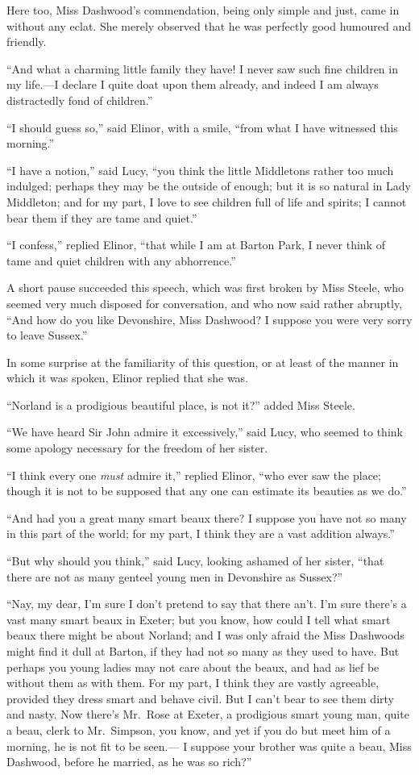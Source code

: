 Here too, Miss Dashwood's commendation, being only
simple and just, came in without any eclat.  She merely
observed that he was perfectly good humoured and friendly.

``And what a charming little family they have!  I
never saw such fine children in my life.---I declare I
quite doat upon them already, and indeed I am always
distractedly fond of children.''

``I should guess so,'' said Elinor, with a smile,
``from what I have witnessed this morning.''

``I have a notion,'' said Lucy, ``you think the little
Middletons rather too much indulged; perhaps they may be the
outside of enough; but it is so natural in Lady Middleton;
and for my part, I love to see children full of life
and spirits; I cannot bear them if they are tame and quiet.''

``I confess,'' replied Elinor, ``that while I am at
Barton Park, I never think of tame and quiet children
with any abhorrence.''

A short pause succeeded this speech, which was first
broken by Miss Steele, who seemed very much disposed
for conversation, and who now said rather abruptly,
``And how do you like Devonshire, Miss Dashwood?  I suppose
you were very sorry to leave Sussex.''

In some surprise at the familiarity of this question,
or at least of the manner in which it was spoken,
Elinor replied that she was.

``Norland is a prodigious beautiful place, is not it?''
added Miss Steele.

``We have heard Sir John admire it excessively,''
said Lucy, who seemed to think some apology necessary
for the freedom of her sister.

``I think every one \emph{must} admire it,'' replied Elinor,
``who ever saw the place; though it is not to be supposed
that any one can estimate its beauties as we do.''

``And had you a great many smart beaux there?  I
suppose you have not so many in this part of the world;
for my part, I think they are a vast addition always.''

``But why should you think,'' said Lucy, looking ashamed
of her sister, ``that there are not as many genteel young
men in Devonshire as Sussex?''

``Nay, my dear, I'm sure I don't pretend to say that there
an't.  I'm sure there's a vast many smart beaux in Exeter;
but you know, how could I tell what smart beaux there
might be about Norland; and I was only afraid the Miss
Dashwoods might find it dull at Barton, if they had not
so many as they used to have.  But perhaps you young ladies
may not care about the beaux, and had as lief be without
them as with them.  For my part, I think they are vastly
agreeable, provided they dress smart and behave civil.
But I can't bear to see them dirty and nasty.  Now there's
Mr.\ Rose at Exeter, a prodigious smart young man,
quite a beau, clerk to Mr.\ Simpson, you know, and yet if you
do but meet him of a morning, he is not fit to be seen.---%
I suppose your brother was quite a beau, Miss Dashwood,
before he married, as he was so rich?''

